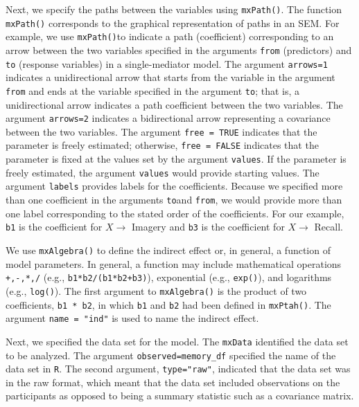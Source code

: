 \documentclass[11pt,]{article}
\begin{document}
Next, we specify the paths between the variables using
\texttt{mxPath()}. The function \texttt{mxPath()} corresponds to the
graphical representation of paths in an SEM. For example, we use
\texttt{mxPath()}to indicate a path (coefficient) corresponding to an
arrow between the two variables specified in the arguments \texttt{from}
(predictors) and \texttt{to} (response variables) in a single-mediator
model. The argument \texttt{arrows=1} indicates a unidirectional arrow
that starts from the variable in the argument \texttt{from} and ends at
the variable specified in the argument \texttt{to}; that is, a
unidirectional arrow indicates a path coefficient between the two
variables. The argument \texttt{arrows=2} indicates a bidirectional
arrow representing a covariance between the two variables. The argument
\texttt{free\ =\ TRUE} indicates that the parameter is freely estimated;
otherwise, \texttt{free\ =\ FALSE} indicates that the parameter is fixed
at the values set by the argument \texttt{values}. If the parameter is
freely estimated, the argument \texttt{values} would provide starting
values. The argument \texttt{labels} provides labels for the
coefficients. Because we specified more than one coefficient in the
arguments \texttt{to}and \texttt{from}, we would provide more than one
label corresponding to the stated order of the coefficients. For our
example, \texttt{b1} is the coefficient for \(X \rightarrow\) Imagery
and \texttt{b3} is the coefficient for \(X \rightarrow\) Recall.

We use \texttt{mxAlgebra()} to define the indirect effect or, in
general, a function of model parameters. In general, a function may
include mathematical operations \texttt{+,-,*,/} (e.g.,
\texttt{b1*b2/(b1*b2+b3)}), exponential (e.g., \texttt{exp()}), and
logarithms (e.g., \texttt{log()}). The first argument to
\texttt{mxAlgebra()} is the product of two coefficients,
\texttt{b1\ *\ b2}, in which \texttt{b1} and \texttt{b2} had been
defined in \texttt{mxPtah()}. The argument \texttt{name\ =\ "ind"} is
used to name the indirect effect.

Next, we specified the data set for the model. The \texttt{mxData}
identified the data set to be analyzed. The argument
\texttt{observed=memory\_df} specified the name of the data set in
\texttt{R}. The second argument, \texttt{type="raw"}, indicated that the
data set was in the raw format, which meant that the data set included
observations on the participants as opposed to being a summary statistic
such as a covariance matrix.
\end{document}
